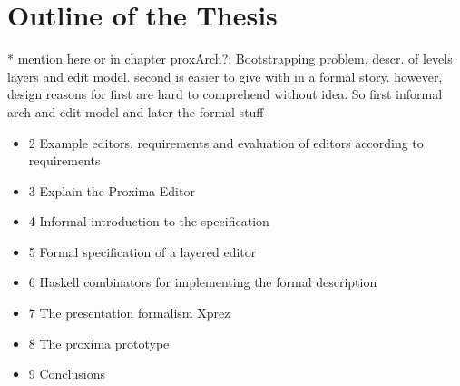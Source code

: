 \section{Outline of the Thesis}
* mention here or in chapter proxArch?:
Bootstrapping problem, descr. of levels layers and edit model. second is easier to give with in a formal story. however, design reasons for first are hard to comprehend without idea. So first informal arch and edit model and later the formal stuff

\begin{itemize}
\item 2 Example editors, requirements and evaluation of editors according to requirements
\item 3 Explain the Proxima Editor
\item 4 Informal introduction to the specification
\item 5 Formal specification of a layered editor
\item 6 Haskell combinators for implementing the formal description
\item 7 The presentation formalism {\sc Xprez}
\item 8 The proxima prototype
\item 9 Conclusions
\end{itemize}



